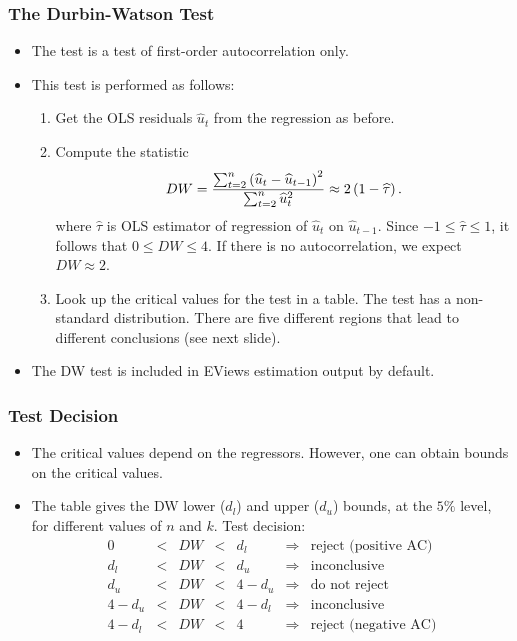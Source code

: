 \begin{frame}
\frametitle{The Durbin-Watson Test}
\begin{itemize}
\item  The  test is a test of first-order autocorrelation only.
\item This test is performed as follows:

\begin{enumerate}
\item Get the OLS residuals $\widehat{u}_{t}$ from the regression as before.


\item Compute the statistic%
\begin{equation*}
DW=\frac{\sum_{t=2}^{n}\left( \widehat{u}_{t}-\widehat{u}_{t-1}\right) ^{2}}{%
\sum_{t=2}^{n}\widehat{u}_{t}^{2}}\approx 2\left( 1-\widehat{\tau }\right) .
\end{equation*}%
where $\hat{\tau}$ is OLS estimator of regression of $\widehat{u}_{t}$ on $%
\widehat{u}_{t-1}$. Since $-1 \leq \widehat{\tau }\leq 1$, it follows that $0\leq DW\leq 4.$
If there is no autocorrelation, we expect $DW\approx 2$.

\item Look up the critical values for the test in a table. The test has a non-standard distribution. There are five different
regions that lead to different conclusions (see next slide).
\end{enumerate}
\item The DW test is included in EViews estimation output by default.
\end{itemize}
\end{frame}

\begin{frame}
\frametitle{Test Decision}
\begin{itemize}
\item The critical values depend on the regressors. However, one can obtain bounds on the critical values.
\item  The table gives the DW lower ($d_l$) and upper ($d_u$) bounds, at the $5\%$ level, for different values of $n$ and $k$. Test decision:
\[
\begin{array}{rrrrrll}
0&<&DW & < & d_l &\Rightarrow &\text{reject (positive AC)}\\
d_l&< &DW & < & d_u &\Rightarrow &\text{inconclusive}\\
d_u&< &DW & < & 4-d_u &\Rightarrow &\text{do not reject}\\
4-d_u&< &DW & < & 4-d_l &\Rightarrow &\text{inconclusive}\\
4-d_l&< &DW & < & 4 &\Rightarrow &\text{reject (negative AC)}
\end{array}
\]
\end{itemize}
\end{frame}

